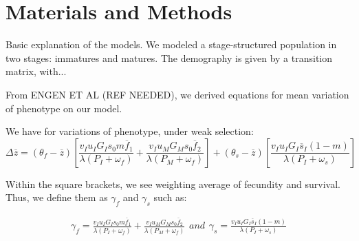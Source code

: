 \section*{Materials and Methods}

Basic explanation of the models. We modeled a stage-structured population in two stages: immatures and matures. The demography is given by a transition matrix, with...

From ENGEN ET AL (REF NEEDED), we derived equations for mean variation of phenotype on our model.

We have for variations of phenotype, under weak selection:
\begin{equation}
\Delta\overline{z} = (\theta_{f} - \overline{z}) \left[ \frac{ v_{I} u_{I} G_{I} s_{0} m \overline{f}_{1} }{\lambda(P_{I}+\omega_{f})} + \frac{ v_{I} u_{M} G_{M} s_{0} \overline{f}_{2}} {\lambda ( P_{M} + \omega_{f} )} \right] + (\theta_{s} - \overline{z}) \left[ \frac{ v_{I} u_{I} G_{I} \overline{s}_{I} (1-m) }{\lambda(P_{I}+\omega_{s})} \right]
\end{equation}

Within the square brackets, we see weighting average of fecundity and survival. Thus, we define them as $\gamma_{f}$ and $\gamma_{s}$ such as:

\begin{subequations}
	\begin{align}
	\gamma_{f} = \frac{ v_{I} u_{I} G_{I} s_{0} m \overline{f}_{1} }{\lambda(P_{I}+\omega_{f})} + \frac{ v_{I} u_{M} G_{M} s_{0} \overline{f}_{2}} {\lambda ( P_{M} + \omega_{f} )}
	\end{align}
	and
	\begin{align}
	\gamma_{s} = \frac{ v_{I} u_{I} G_{I} \overline{s}_{I} (1-m) }{\lambda(P_{I}+\omega_{s})}
	\end{align}
\end{subequations}
	
